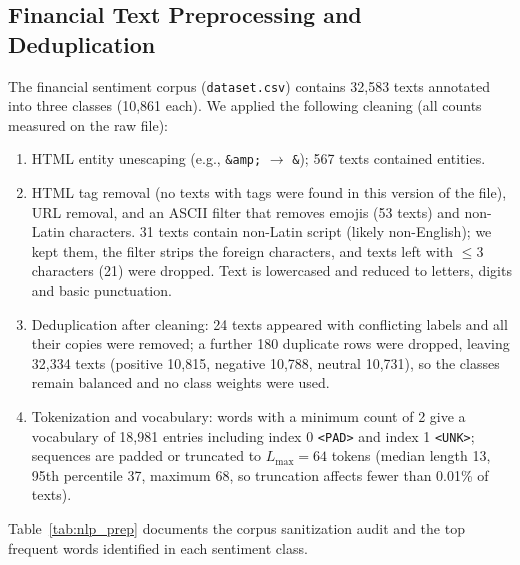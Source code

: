 \documentclass[10pt,journal]{IEEEtran}
\begin{document}
\subsection{Financial Text Preprocessing and Deduplication}
The financial sentiment corpus (\texttt{dataset.csv}) contains 32,583 texts annotated into three classes (10,861 each). We applied the following cleaning (all counts measured on the raw file):
\begin{enumerate}
  \item HTML entity unescaping (e.g., \texttt{\&amp;} $\rightarrow$ \texttt{\&}); 567 texts contained entities.
  \item HTML tag removal (no texts with tags were found in this version of the file), URL removal, and an ASCII filter that removes emojis (53 texts) and non-Latin characters. 31 texts contain non-Latin script (likely non-English); we kept them, the filter strips the foreign characters, and texts left with $\le 3$ characters (21) were dropped. Text is lowercased and reduced to letters, digits and basic punctuation.
  \item Deduplication after cleaning: 24 texts appeared with conflicting labels and all their copies were removed; a further 180 duplicate rows were dropped, leaving 32,334 texts (positive 10,815, negative 10,788, neutral 10,731), so the classes remain balanced and no class weights were used.
  \item Tokenization and vocabulary: words with a minimum count of 2 give a vocabulary of 18,981 entries including index 0 \texttt{<PAD>} and index 1 \texttt{<UNK>}; sequences are padded or truncated to $L_{\text{max}} = 64$ tokens (median length 13, 95th percentile 37, maximum 68, so truncation affects fewer than 0.01\% of texts).
\end{enumerate}

Table~\ref{tab:nlp_prep} documents the corpus sanitization audit and the top frequent words identified in each sentiment class.
\end{document}
